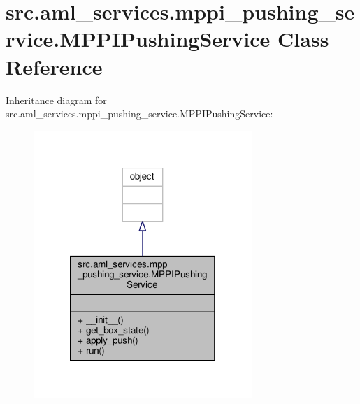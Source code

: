 \hypertarget{classsrc_1_1aml__services_1_1mppi__pushing__service_1_1_m_p_p_i_pushing_service}{\section{src.\-aml\-\_\-services.\-mppi\-\_\-pushing\-\_\-service.\-M\-P\-P\-I\-Pushing\-Service Class Reference}
\label{classsrc_1_1aml__services_1_1mppi__pushing__service_1_1_m_p_p_i_pushing_service}
}


Inheritance diagram for src.\-aml\-\_\-services.\-mppi\-\_\-pushing\-\_\-service.\-M\-P\-P\-I\-Pushing\-Service\-:
\nopagebreak
\begin{figure}[H]
\begin{center}
\leavevmode
\includegraphics[width=234pt]{classsrc_1_1aml__services_1_1mppi__pushing__service_1_1_m_p_p_i_pushing_service__inherit__graph}
\end{center}
\end{figure}


